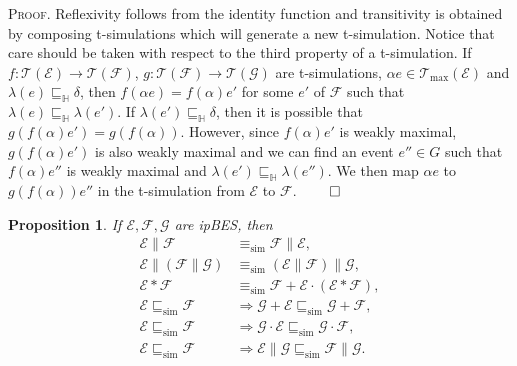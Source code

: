 \documentclass[review]{elsart}
\newtheorem{proposition}[definition]{Proposition}
\newenvironment{proof}{\par
\noindent
\textsc{Proof. }
\noindent}{\hfill\(\qed\)}
\newcommand{\EE}{\mathcal{E}}
\newcommand{\FF}{\mathcal{F}}
\newcommand{\GG}{\mathcal{G}}
\newcommand{\TT}{\mathcal{T}}
\newcommand{\unity}{\delta}
\newcommand{\bks}{*}
\newcommand{\refby}{\sqsubseteq}
\newcommand{\refbyh}{\sqsubseteq_{\mathbb{H}}}
\newcommand{\simref}{\refby_{\mathrm{sim}}}
\begin{document}
\begin{proof}
Reflexivity follows from the identity function and transitivity is obtained by composing t-simulations which will generate a new t-simulation. Notice that care should be taken with respect to the third property of a t-simulation. If $f{:}\TT(\EE){\to}\TT(\FF)$, $g{:}\TT(\FF){\to}\TT(\GG)$ are t-simulations, $\alpha e{\in}\TT_{\max}(\EE)$ and $\lambda(e){\refbyh}\unity$, then $f(\alpha e) {=} f(\alpha) e'$ for some $e'$ of $\FF$ such that $\lambda(e){\refbyh}\lambda(e')$. If $\lambda(e'){\refbyh}\unity$, then it is possible that $g(f(\alpha)e') {=} g(f(\alpha))$. However, since $f(\alpha)e'$ is weakly maximal, $g(f(\alpha)e')$ is also weakly maximal and we can find an event $e''{\in} G$ such that $f(\alpha)e''$ is weakly maximal and $\lambda(e'){\refbyh}\lambda(e'')$. We then map $\alpha e$ to $g(f(\alpha))e''$ in the t-simulation from $\EE$ to $\FF$.
\end{proof}

\begin{proposition}\label{pro:necessary-axioms}
If $\EE,\FF,\GG$ are ipBES, then
\begin{align}
\EE \| \FF &\equiv_{\mathrm{sim}} \FF\|\EE,\label{eq:par-comm}\\
\EE \| (\FF \| \GG) &\equiv_{\mathrm{sim}} (\EE\|\FF)\|\GG,\label{eq:par-assoc}\\
\EE{\bks} \FF&\equiv_{\mathrm{sim}}\FF {+} \EE{\cdot} (\EE{\bks} \FF),\label{eq:unfold}\\
\EE\simref\FF & \Rightarrow\GG{+}\EE\simref\GG{+}\FF,\label{eq:+-monotony}\\
\EE\simref\FF & \Rightarrow\GG{\cdot}\EE\simref\GG{\cdot}\FF,\label{eq:monotony}\\
\EE\simref\FF & \Rightarrow \EE\|\GG\simref\FF\|\GG.\label{eq:congruence}
\end{align}
\end{proposition}
\end{document}
